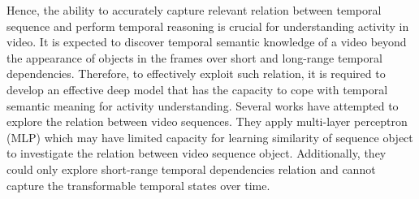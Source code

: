 \documentclass[conference,compsoc]{IEEEtran}
\begin{document}
    Hence, the ability to accurately capture relevant relation between temporal sequence and perform temporal reasoning is crucial for understanding activity in video. It is expected to discover temporal semantic knowledge of a video beyond the appearance of objects in the frames over short and long-range temporal dependencies. Therefore, to effectively exploit such relation, it is required to develop an effective deep model that has the capacity to cope with temporal semantic meaning for activity understanding. Several works \cite{wang2018appearance-and-relation, zhou2018temporal} have attempted to explore the relation between video sequences. They apply multi-layer perceptron (MLP) which may have limited capacity for learning similarity of sequence object to investigate the relation between video sequence object. Additionally, they could only explore short-range temporal dependencies relation and cannot capture the transformable temporal states over time.
    
\end{document}
